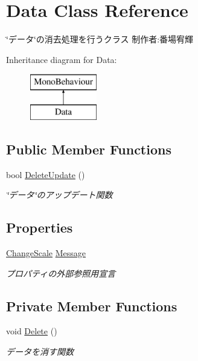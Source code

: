 \hypertarget{class_data}{}\section{Data Class Reference}
\label{class_data}


\char`\"{}データ\char`\"{}の消去処理を行うクラス 制作者\+:番場宥輝  


Inheritance diagram for Data\+:\begin{figure}[H]
\begin{center}
\leavevmode
\includegraphics[height=2.000000cm]{class_data}
\end{center}
\end{figure}
\subsection*{Public Member Functions}
\begin{DoxyCompactItemize}
\item 
bool \hyperlink{class_data_a74ae220d24ccbc1a1c4022f0177f186b}{Delete\+Update} ()
\begin{DoxyCompactList}\small\item\em \char`\"{}データ\char`\"{}のアップデート関数 \end{DoxyCompactList}\end{DoxyCompactItemize}
\subsection*{Properties}
\begin{DoxyCompactItemize}
\item 
\hyperlink{class_change_scale}{Change\+Scale} \hyperlink{class_data_aaf5b5290f19865c3098f8b46a70947ea}{Message}
\begin{DoxyCompactList}\small\item\em プロパティの外部参照用宣言 \end{DoxyCompactList}\end{DoxyCompactItemize}
\subsection*{Private Member Functions}
\begin{DoxyCompactItemize}
\item 
void \hyperlink{class_data_a7ca377572bce52bd389a9c3612222f14}{Delete} ()
\begin{DoxyCompactList}\small\item\em データを消す関数 \end{DoxyCompactList}\end{DoxyCompactItemize}
